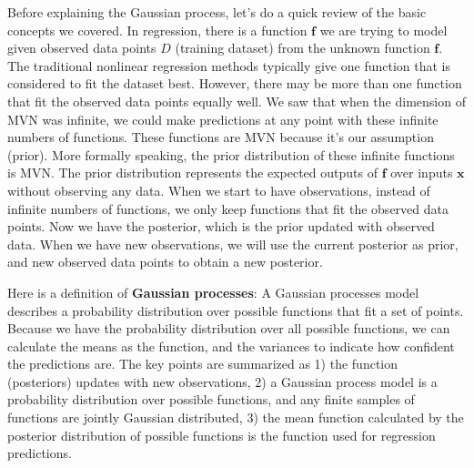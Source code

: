 \documentclass[preprint,12pt]{elsarticle}
\begin{document}
Before explaining the Gaussian process, let's do a quick review of the basic concepts we covered. In regression, there is a function $\mathbf{f}$ we are trying to model given observed data points $D$ (training dataset) from the unknown function $\mathbf{f}$. The traditional nonlinear regression methods typically give one function that is considered to fit the dataset best. However, there may be more than one function that fit the observed data points equally well. We saw that when the dimension of MVN was infinite, we could make predictions at any point with these infinite numbers of functions. These functions are MVN because it's our assumption (prior). More formally speaking, the prior distribution of these infinite functions is MVN. The prior distribution represents the expected outputs of $\mathbf{f}$ over inputs $\mathbf{x}$ without observing any data. When we start to have observations, instead of infinite numbers of functions, we only keep functions that fit the observed data points. Now we have the posterior, which is the prior updated with observed data. When we have new observations, we will use the current posterior as prior, and new observed data points to obtain a new posterior.  

Here is a definition of \textbf{Gaussian processes}: A Gaussian processes model describes a probability distribution over possible functions that fit a set of points. Because we have the probability distribution over all possible functions, we can calculate the means as the function, and the variances to indicate how confident the predictions are. The key points are summarized as 1) the function (posteriors) updates with new observations, 2) a Gaussian process model is a probability distribution over possible functions, and any finite samples of functions are jointly Gaussian distributed, 3) the mean function calculated by the posterior distribution of possible functions is the function used for regression predictions.
\end{document}
